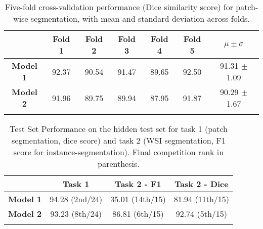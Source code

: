 \begin{table}[!t]
\renewcommand{\arraystretch}{1.5}
\setlength\tabcolsep{3.50pt}
 {\bf  
\begin{center}
\caption{Five-fold cross-validation performance (Dice similarity score) for patch-wise segmentation, with mean and standard deviation across folds.}\label{table_1}
\begin{tabular}{c cccccc}
\midrule
                       &  Fold 1 &  Fold 2  &  Fold 3  &  Fold 4 &  Fold 5 &  $\mu\pm\sigma$ \\
\midrule
\textbf{Model 1}       & 92.37 & 90.54 & 91.47    & 89.65 & 92.50 & 91.31 $\pm$ 1.09       \\
\midrule
\textbf{Model 2}       & 91.96 & 89.75 & 89.94    & 87.95 & 91.87 & 90.29 $\pm$ 1.67   \\
\bottomrule
\\[-0.25cm]
\end{tabular}
% 
\end{center}
}
\vspace{-0.5cm}
\end{table} 


\begin{table}[!b]
\renewcommand{\arraystretch}{1.5}
\setlength\tabcolsep{3.50pt}
 {\bf  
\begin{center}
\caption{Test Set Performance on the hidden test set for task 1 (patch segmentation, dice score) and task 2 (WSI segmentation, F1 score for instance-segmentation). Final competition rank in parenthesis.}\label{table_2}
\begin{tabular}{c ccc}
\midrule
                       &  \textbf{Task 1} & \textbf{Task 2 - F1} & \textbf{Task 2 - Dice}   \\
\midrule
\textbf{Model 1}       & 94.28 (2nd/24)   & 35.01 (14th/15) & 81.94 (11th/15)  \\
\midrule
\textbf{Model 2}       & 93.23 (8th/24)   & 86.81 (6th/15)  & 92.74 (5th/15)\\
\bottomrule
\\[-0.25cm]
\end{tabular}

\end{center}
}
\vspace{-0.5cm}
\end{table} 

